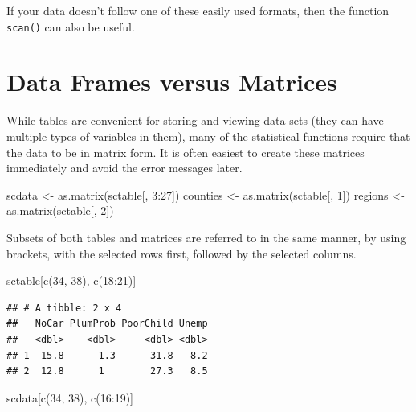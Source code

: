 \documentclass[
]{book}
\newenvironment{Shaded}{\begin{snugshade}}{\end{snugshade}}
\newcommand{\DecValTok}[1]{\textcolor[rgb]{0.00,0.00,0.81}{#1}}
\newcommand{\FunctionTok}[1]{\textcolor[rgb]{0.00,0.00,0.00}{#1}}
\newcommand{\NormalTok}[1]{#1}
\newcommand{\OtherTok}[1]{\textcolor[rgb]{0.56,0.35,0.01}{#1}}
\newcommand{\SpecialCharTok}[1]{\textcolor[rgb]{0.00,0.00,0.00}{#1}}
\begin{document}
If your data doesn't follow one of these easily used formats, then the function \texttt{scan()} can also be useful.

\hypertarget{data-frames-versus-matrices}{%
\section{Data Frames versus Matrices}\label{data-frames-versus-matrices}}

While tables are convenient for storing and viewing data sets (they can have multiple types of variables in them), many of the statistical functions require that the data to be in matrix form. It is often easiest to create these matrices immediately and avoid the error messages later.

\begin{Shaded}
\begin{Highlighting}[]
\NormalTok{scdata }\OtherTok{\textless{}{-}} \FunctionTok{as.matrix}\NormalTok{(sctable[, }\DecValTok{3}\SpecialCharTok{:}\DecValTok{27}\NormalTok{])}
\NormalTok{counties }\OtherTok{\textless{}{-}} \FunctionTok{as.matrix}\NormalTok{(sctable[, }\DecValTok{1}\NormalTok{])}
\NormalTok{regions }\OtherTok{\textless{}{-}} \FunctionTok{as.matrix}\NormalTok{(sctable[, }\DecValTok{2}\NormalTok{])}
\end{Highlighting}
\end{Shaded}

Subsets of both tables and matrices are referred to in the same manner, by using brackets, with the selected rows first, followed by the selected columns.

\begin{Shaded}
\begin{Highlighting}[]
\NormalTok{sctable[}\FunctionTok{c}\NormalTok{(}\DecValTok{34}\NormalTok{, }\DecValTok{38}\NormalTok{), }\FunctionTok{c}\NormalTok{(}\DecValTok{18}\SpecialCharTok{:}\DecValTok{21}\NormalTok{)]}
\end{Highlighting}
\end{Shaded}

\begin{verbatim}
## # A tibble: 2 x 4
##   NoCar PlumProb PoorChild Unemp
##   <dbl>    <dbl>     <dbl> <dbl>
## 1  15.8      1.3      31.8   8.2
## 2  12.8      1        27.3   8.5
\end{verbatim}

\begin{Shaded}
\begin{Highlighting}[]
\NormalTok{scdata[}\FunctionTok{c}\NormalTok{(}\DecValTok{34}\NormalTok{, }\DecValTok{38}\NormalTok{), }\FunctionTok{c}\NormalTok{(}\DecValTok{16}\SpecialCharTok{:}\DecValTok{19}\NormalTok{)]}
\end{Highlighting}
\end{Shaded}
\end{document}
